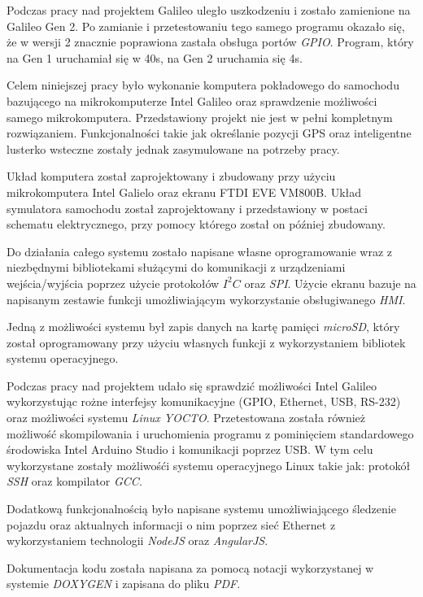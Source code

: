 \documentclass{xmgr}
\begin{document}
Podczas pracy nad projektem Galileo uległo uszkodzeniu i zostało zamienione na Galileo Gen 2. Po zamianie i przetestowaniu tego samego programu okazało się, że w wersji 2 znacznie poprawiona zastała obsługa portów \emph{GPIO}. Program, który na Gen 1 uruchamiał się w 40s, na Gen 2 uruchamia się 4s.

\summary
Celem niniejszej pracy było wykonanie komputera pokładowego do samochodu bazującego na mikrokomputerze Intel Galileo oraz sprawdzenie możliwości samego mikrokomputera. Przedstawiony projekt nie jest w pełni kompletnym rozwiązaniem. Funkcjonalności takie jak określanie pozycji GPS oraz inteligentne lusterko wsteczne zostały jednak zasymulowane na potrzeby pracy.

Układ komputera został zaprojektowany i zbudowany przy użyciu mikrokomputera Intel Galielo oraz ekranu FTDI EVE VM800B. Układ symulatora samochodu został zaprojektowany i przedstawiony w postaci schematu elektrycznego, przy pomocy którego został on później zbudowany. 

Do działania całego systemu zostało napisane własne oprogramowanie wraz z niezbędnymi bibliotekami służącymi do komunikacji z urządzeniami wejścia/wyjścia poprzez użycie protokołów $I^2C$ oraz \emph{SPI}. Użycie ekranu bazuje na napisanym zestawie funkcji umożliwiającym wykorzystanie obsługiwanego \emph{HMI}.

Jedną z możliwości systemu był zapis danych na kartę pamięci \emph{microSD}, który został oprogramowany przy użyciu własnych funkcji z wykorzystaniem bibliotek systemu operacyjnego. 

Podczas pracy nad projektem udało się sprawdzić możliwości Intel Galileo wykorzystując rożne interfejsy komunikacyjne (GPIO, Ethernet, USB, RS-232) oraz możliwości systemu \emph{Linux YOCTO}. Przetestowana została również możliwość skompilowania i uruchomienia programu z pominięciem standardowego środowiska Intel Arduino Studio i komunikacji poprzez USB. W tym celu wykorzystane zostały możliwośći systemu operacyjnego Linux takie jak: protokół \emph{SSH} oraz kompilator \emph{GCC}. 

Dodatkową funkcjonalnością było napisane systemu umożliwiającego śledzenie pojazdu oraz aktualnych informacji o nim poprzez sieć Ethernet z wykorzystaniem technologii \emph{NodeJS} oraz \emph{AngularJS}.

Dokumentacja kodu została napisana za pomocą notacji wykorzystanej w systemie \emph{DOXYGEN} i zapisana do pliku \emph{PDF}.
\end{document}
